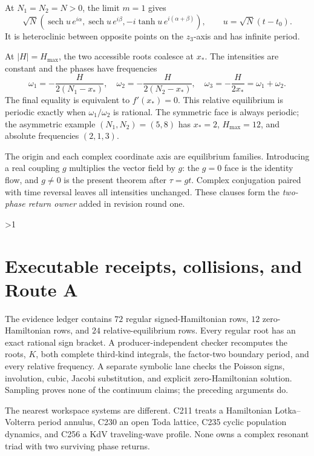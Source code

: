 \documentclass[10pt]{article}
\providecommand{\CRevisionRound}{2}
\begin{document}
At $N_1=N_2=N>0$, the limit $m=1$ gives
\begin{equation}\label{eq:separatrix}
 \sqrt N\left(\operatorname{sech}u\,e^{i\alpha},
 \operatorname{sech}u\,e^{i\beta},
 -i\tanh u\,e^{i(\alpha+\beta)}\right),\qquad
 u=\sqrt N(t-t_0).
\end{equation}
It is heteroclinic between opposite points on the $z_3$-axis and has
infinite period.

At $|H|=H_{\max}$, the two accessible roots coalesce at $x_*$.  The
intensities are constant and the phases have frequencies
\begin{equation}\label{eq:omegas}
 \omega_1=-\frac{H}{2(N_1-x_*)},\quad
 \omega_2=-\frac{H}{2(N_2-x_*)},\quad
 \omega_3=-\frac{H}{2x_*}=\omega_1+\omega_2.
\end{equation}
The final equality is equivalent to $f'(x_*)=0$.  This relative equilibrium
is periodic exactly when $\omega_1/\omega_2$ is rational.  The symmetric
face is always periodic; the asymmetric example $(N_1,N_2)=(5,8)$ has
$x_*=2$, $H_{\max}=12$, and absolute frequencies $(2,1,3)$.

The origin and each complex coordinate axis are equilibrium families.
Introducing a real coupling $g$ multiplies the vector field by $g$: the
$g=0$ face is the identity flow, and $g\ne0$ is the present theorem after
$\tau=gt$.  Complex conjugation paired with time reversal leaves all
intensities unchanged.  These clauses form the \emph{two-phase return owner}
added in revision round one.
\fi

\ifnum\CRevisionRound>1
\section{Executable receipts, collisions, and Route A}
The evidence ledger contains $72$ regular signed-Hamiltonian rows, $12$
zero-Hamiltonian rows, and $24$ relative-equilibrium rows.  Every regular
root has an exact rational sign bracket.  A producer-independent checker
recomputes the roots, $K$, both complete third-kind integrals, the factor-two
boundary period, and every relative frequency.  A separate symbolic lane
checks the Poisson signs, involution, cubic, Jacobi substitution, and explicit
zero-Hamiltonian solution.  Sampling proves none of the continuum claims;
the preceding arguments do.

The nearest workspace systems are different.  C211 treats a Hamiltonian
Lotka--Volterra period annulus, C230 an open Toda lattice, C235 cyclic
population dynamics, and C256 a KdV traveling-wave profile.  None owns a
complex resonant triad with two surviving phase returns.
\end{document}
